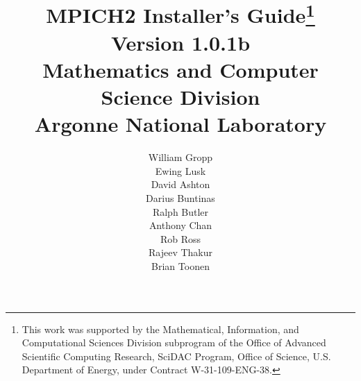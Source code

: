 \documentclass[dvipdfm,11pt]{article}
\begin{document}
\title{{\bf MPICH2 Installer's Guide}\thanks{This work was supported by the
    Mathematical, Information, and Computational Sciences Division
    subprogram of the Office of Advanced Scientific Computing Research,
    SciDAC Program, Office of Science, U.S. Department of Energy, under
    Contract
    W-31-109-ENG-38.}\\
  Version 1.0.1b\\
  Mathematics and Computer Science Division\\
  Argonne National Laboratory}

\author{William Gropp\\
Ewing Lusk\\
David Ashton\\
Darius Buntinas\\
Ralph Butler\\
Anthony Chan\\
Rob Ross\\
Rajeev Thakur\\
Brian Toonen}

\maketitle
\cleardoublepage

\tableofcontents
\clearpage

\pagestyle{headings}


\end{document}
